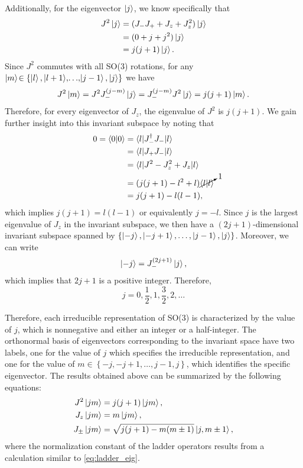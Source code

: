 Additionally, for the eigenvector $\ket{j}$, we know specifically that
\begin{align*}
    J^2\ket{j} &= (J_- J_+ + J_z + J_z^2 )\ket{j} \\
    &= (0 + j + j^2)\ket{j} \\
    &= j(j+1)\ket{j}.
\end{align*}
Since $J^2$ commutes with all SO(3) rotations, for any $\ket{m}\!\in\left\{ \ket{l}, \ket{l+1}\!,\! \dots\!,\!\ket{j-1}, \ket{j} \right\}$ we have
\begin{align*}
    J^2\ket{m} = J^2 J_-^{(j-m)}\ket{j} = J_-^{(j-m)} J^2\ket{j} = j(j+1)\ket{m}.
\end{align*}
Therefore, for every eigenvector of $J_z$, the eigenvalue of $J^2$ is $j(j+1)$. We gain further insight into this invariant subspace by noting that
\begin{align}
    0 = \braket{0|0}
        &= \braket{l|J_-^\dagger J_-|l} \nonumber \\
        &= \braket{l|J_+ J_-|l} \nonumber \\
        &= \braket{l|J^2 - J_z^2 + J_z|l} \nonumber \\
        &= (j(j+1) - l^2 + l)\cancelto{1}{\braket{l|l}} \nonumber \\
        &= j(j+1) - l(l-1), \label{eq:ladder_eig}
\end{align}
which implies $j(j+1) = l(l-1)$ or equivalently $j = -l$. Since $j$ is the largest eigenvalue of $J_z$ in the invariant subspace, we then have a $(2j+1)$-dimensional invariant subspace spanned by $\left\{ \ket{-j}, \ket{-j+1}, \dots, \ket{j-1}, \ket{j} \right\}$. Moreover, we can write
\begin{align*}
    \ket{-j} = J_-^{(2j+1)}\ket{j},
\end{align*}
which implies that $2j+1$ is a positive integer. Therefore,
\begin{equation}
    j=0,\frac{1}{2},1,\frac{3}{2},2,\dots
\end{equation}

Therefore, each irreducible representation of SO(3) is characterized by the value of $j$, which is nonnegative and either an integer or a half-integer. The orthonormal basis of eigenvectors corresponding to the invariant space have two labels, one for the value of $j$ which specifies the irreducible representation, and one for the value of $m\in\left\{ -j,-j+1,\dots,j-1,j \right\}$, which identifies the specific eigenvector. The results obtained above can be summarized by the following equations:
\begin{align}
    J^2\ket{jm} &= j(j+1)\ket{jm}, \\
    J_z\ket{jm} &= m\ket{jm}, \\
    J_\pm\ket{jm} &= \sqrt{j(j+1)-m(m\pm 1)}\ket{j,m\pm 1},
\end{align}
where the normalization constant of the ladder operators results from a calculation similar to \cref{eq:ladder_eig}.

